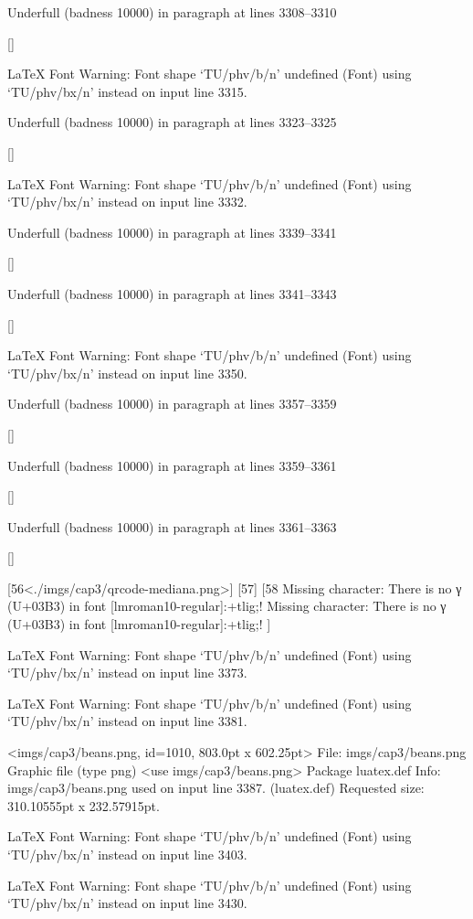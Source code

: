 Underfull \hbox (badness 10000) in paragraph at lines 3308--3310

 []


LaTeX Font Warning: Font shape `TU/phv/b/n' undefined
(Font)              using `TU/phv/bx/n' instead on input line 3315.


Underfull \hbox (badness 10000) in paragraph at lines 3323--3325

 []


LaTeX Font Warning: Font shape `TU/phv/b/n' undefined
(Font)              using `TU/phv/bx/n' instead on input line 3332.


Underfull \hbox (badness 10000) in paragraph at lines 3339--3341

 []


Underfull \hbox (badness 10000) in paragraph at lines 3341--3343

 []


LaTeX Font Warning: Font shape `TU/phv/b/n' undefined
(Font)              using `TU/phv/bx/n' instead on input line 3350.


Underfull \hbox (badness 10000) in paragraph at lines 3357--3359

 []


Underfull \hbox (badness 10000) in paragraph at lines 3359--3361

 []


Underfull \hbox (badness 10000) in paragraph at lines 3361--3363

 []

[56<./imgs/cap3/qrcode-mediana.png>] [57] [58
Missing character: There is no γ (U+03B3) in font [lmroman10-regular]:+tlig;!
Missing character: There is no γ (U+03B3) in font [lmroman10-regular]:+tlig;!
]

LaTeX Font Warning: Font shape `TU/phv/b/n' undefined
(Font)              using `TU/phv/bx/n' instead on input line 3373.


LaTeX Font Warning: Font shape `TU/phv/b/n' undefined
(Font)              using `TU/phv/bx/n' instead on input line 3381.

<imgs/cap3/beans.png, id=1010, 803.0pt x 602.25pt>
File: imgs/cap3/beans.png Graphic file (type png)
<use imgs/cap3/beans.png>
Package luatex.def Info: imgs/cap3/beans.png  used on input line 3387.
(luatex.def)             Requested size: 310.10555pt x 232.57915pt.

LaTeX Font Warning: Font shape `TU/phv/b/n' undefined
(Font)              using `TU/phv/bx/n' instead on input line 3403.


LaTeX Font Warning: Font shape `TU/phv/b/n' undefined
(Font)              using `TU/phv/bx/n' instead on input line 3430.


